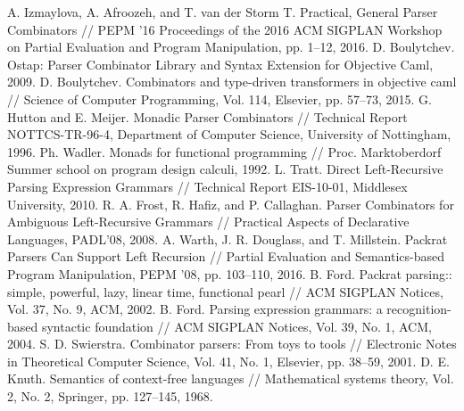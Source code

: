 \documentclass[conference]{IEEEtran}
\begin{document}
\begin{thebibliography}{00}
 A. Izmaylova, A. Afroozeh, and T. van der Storm T. Practical, General Parser Combinators // PEPM '16 Proceedings of the 2016 ACM SIGPLAN Workshop on Partial Evaluation and Program Manipulation, pp. 1--12, 2016.
 D. Boulytchev. Ostap: Parser Combinator Library and Syntax Extension for Objective Caml, 2009.
 D. Boulytchev. Combinators and type-driven transformers in objective caml // Science of Computer Programming, Vol. 114, Elsevier, pp. 57--73, 2015.
 G. Hutton and E. Meijer. Monadic Parser Combinators // Technical Report NOTTCS-TR-96-4, Department of Computer Science, University of Nottingham, 1996.
 Ph. Wadler. Monads for functional programming // Proc. Marktoberdorf Summer school on program design calculi, 1992.
 L. Tratt. Direct Left-Recursive Parsing Expression Grammars // Technical Report EIS-10-01, Middlesex University, 2010.
 R. A. Frost, R. Hafiz, and P. Callaghan. Parser Combinators for Ambiguous Left-Recursive Grammars // Practical Aspects of Declarative Languages, PADL’08, 2008.
 A. Warth, J. R. Douglass, and T. Millstein. Packrat Parsers Can Support Left Recursion // Partial Evaluation and Semantics-based Program Manipulation, PEPM ’08, pp. 103--110, 2016.
 B. Ford. Packrat parsing:: simple, powerful, lazy, linear time, functional pearl // ACM SIGPLAN Notices, Vol. 37, No. 9, ACM, 2002.
 B. Ford. Parsing expression grammars: a recognition-based syntactic foundation // ACM SIGPLAN Notices, Vol. 39, No. 1, ACM, 2004.
 S. D. Swierstra. Combinator parsers: From toys to tools // Electronic Notes in Theoretical Computer Science, Vol. 41, No. 1, Elsevier, pp. 38--59, 2001.
 D. E. Knuth. Semantics of context-free languages // Mathematical systems theory, Vol. 2, No. 2, Springer, pp. 127--145, 1968.

\end{thebibliography}
\end{document}
